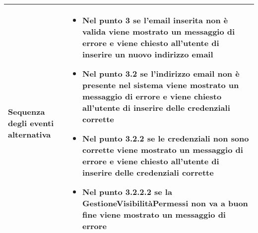 \begin{tabular}{|p{3cm}|p{7cm}|}
\hline
  Sequenza degli eventi alternativa & \begin{itemize}
  \item Nel punto 3 se l'email inserita non è valida viene mostrato un messaggio di
errore e viene chiesto all'utente di inserire un nuovo indirizzo email
\item Nel punto 3.2 se l'indirizzo email non è presente nel sistema viene mostrato un
messaggio di errore e viene chiesto all'utente di inserire delle credenziali corrette
\item Nel punto 3.2.2 se le credenziali non sono corrette viene mostrato un messaggio
di errore e viene chiesto all'utente di inserire delle credenziali corrette
\item Nel punto 3.2.2.2 se la GestioneVisibilitàPermessi non va a buon fine
viene mostrato un messaggio di errore
\end{itemize}\\
\hline
\end{tabular}\\

